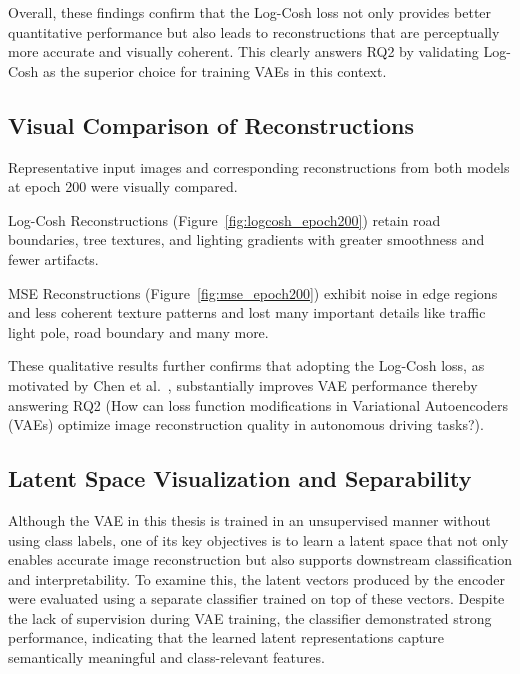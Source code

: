 Overall, these findings confirm that the Log-Cosh loss not only provides better quantitative performance but also leads to reconstructions that are perceptually more accurate and visually coherent. This clearly answers RQ2 by validating Log-Cosh as the superior choice for training VAEs in this context.


\clearpage


\subsection{Visual Comparison of Reconstructions} \label{subsubsec:vae_visual_recon}
Representative input images and corresponding reconstructions from both models at epoch 200 were visually compared.

Log-Cosh Reconstructions (Figure~\ref{fig:logcosh_epoch200}) retain road boundaries, tree textures, and lighting gradients with greater smoothness and fewer artifacts.

MSE Reconstructions (Figure~\ref{fig:mse_epoch200}) exhibit noise in edge regions and less coherent texture patterns and lost many important details like traffic light pole, road boundary and many more.

These qualitative results further confirms that adopting the Log-Cosh loss, as motivated by Chen et al.~\cite{chen2019log}, substantially improves VAE performance thereby answering RQ2 (How can loss function modifications in Variational Autoencoders (VAEs) optimize image reconstruction quality in autonomous driving tasks?).


\subsection{Latent Space Visualization and Separability}
\label{subsubsec:vae_latent_space}

Although the VAE in this thesis is trained in an unsupervised manner without using class labels, one of its key objectives is to learn a latent space that not only enables accurate image reconstruction but also supports downstream classification and interpretability. To examine this, the latent vectors produced by the encoder were evaluated using a separate classifier trained on top of these vectors. Despite the lack of supervision during VAE training, the classifier demonstrated strong performance, indicating that the learned latent representations capture semantically meaningful and class-relevant features.

